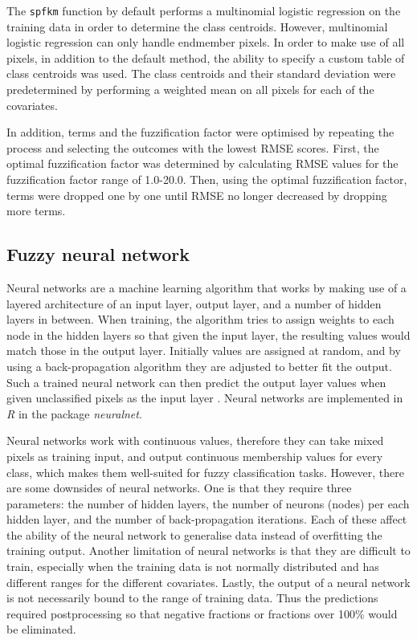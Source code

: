 \documentclass[a4paper,10pt]{book}
\begin{document}
The \texttt{spfkm} function by default performs a multinomial logistic regression on the training data in order to determine the class centroids. However, multinomial logistic regression can only handle endmember pixels. In order to make use of all pixels, in addition to the default method, the ability to specify a custom table of class centroids was used. The class centroids and their standard deviation were predetermined by performing a weighted mean on all pixels for each of the covariates.

In addition, terms and the fuzzification factor were optimised by repeating the process and selecting the outcomes with the lowest RMSE scores.  First, the optimal fuzzification factor was determined by calculating RMSE values for the fuzzification factor range of 1.0-20.0. Then, using the optimal fuzzification factor, terms were dropped one by one until RMSE no longer decreased by dropping more terms.

\subsection{Fuzzy neural network}

Neural networks are a machine learning algorithm that works by making use of a layered architecture of an input layer, output layer, and a number of hidden layers in between. When training, the algorithm tries to assign weights to each node in the hidden layers so that given the input layer, the resulting values would match those in the output layer. Initially values are assigned at random, and by using a back-propagation algorithm they are adjusted to better fit the output. Such a trained neural network can then predict the output layer values when given unclassified pixels as the input layer \citep{foody1997fuzzynnet}. Neural networks are implemented in \textit{R} in the package \textit{neuralnet}.

Neural networks work with continuous values, therefore they can take mixed pixels as training input, and output continuous membership values for every class, which makes them well-suited for fuzzy classification tasks. However, there are some downsides of neural networks. One is that they require three parameters: the number of hidden layers, the number of neurons (nodes) per each hidden layer, and the number of back-propagation iterations. Each of these affect the ability of the neural network to generalise data instead of overfitting the training output. Another limitation of neural networks is that they are difficult to train, especially when the training data is not normally distributed and has different ranges for the different covariates. Lastly, the output of a neural network is not necessarily bound to the range of training data. Thus the predictions required postprocessing so that negative fractions or fractions over 100\% would be eliminated.
\end{document}

